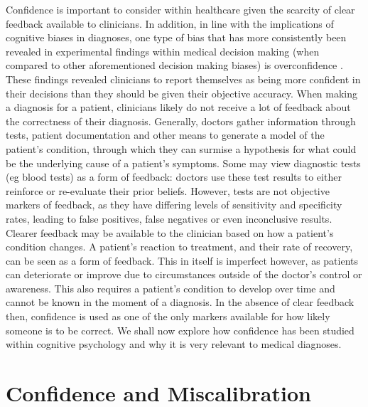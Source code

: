 \documentclass[a4paper, nobind]{templates/ociamthesis}
\begin{document}
\hfill\break
Confidence is important to consider within healthcare given the scarcity of clear feedback available to clinicians. In addition, in line with the implications of cognitive biases in diagnoses, one type of bias that has more consistently been revealed in experimental findings within medical decision making (when compared to other aforementioned decision making biases) is overconfidence \autocite{berner_overconfidence_2008,meyer_physicians_2013}. These findings revealed clinicians to report themselves as being more confident in their decisions than they should be given their objective accuracy. When making a diagnosis for a patient, clinicians likely do not receive a lot of feedback about the correctness of their diagnosis. Generally, doctors gather information through tests, patient documentation and other means to generate a model of the patient's condition, through which they can surmise a hypothesis for what could be the underlying cause of a patient's symptoms. Some may view diagnostic tests (eg blood tests) as a form of feedback: doctors use these test results to either reinforce or re-evaluate their prior beliefs. However, tests are not objective markers of feedback, as they have differing levels of sensitivity and specificity rates, leading to false positives, false negatives or even inconclusive results. Clearer feedback may be available to the clinician based on how a patient's condition changes. A patient's reaction to treatment, and their rate of recovery, can be seen as a form of feedback. This in itself is imperfect however, as patients can deteriorate or improve due to circumstances outside of the doctor's control or awareness. This also requires a patient's condition to develop over time and cannot be known in the moment of a diagnosis. In the absence of clear feedback then, confidence is used as one of the only markers available for how likely someone is to be correct. We shall now explore how confidence has been studied within cognitive psychology and why it is very relevant to medical diagnoses.

\section*{Confidence and Miscalibration}\label{confidence-and-miscalibration}
\end{document}
